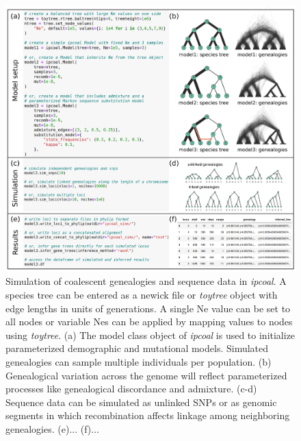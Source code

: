 \documentclass[11pt]{article}
\begin{document}
\begin{figure}
  \centering
  \includegraphics[width=15cm]{figures/composite.pdf}
  \caption{Simulation of coalescent genealogies and sequence data in \emph{ipcoal}. A species tree can be entered as a newick file or \emph{toytree} object with edge lengths in units of generations. A single Ne value can be set to all nodes or variable Nes can be applied by mapping values to nodes using \emph{toytree}. (a) The model class object of \emph{ipcoal} is used to initialize parameterized demographic and mutational models. Simulated genealogies can sample multiple individuals per population. (b) Genealogical variation across the genome will reflect parameterized processes like genealogical discordance and admixture. (c-d) Sequence data can be simulated as unlinked SNPs or as genomic segments in which recombination affects linkage among neighboring genealogies. (e)... (f)... }
  \label{fig:fig1}
\end{figure}



  
\end{document}
